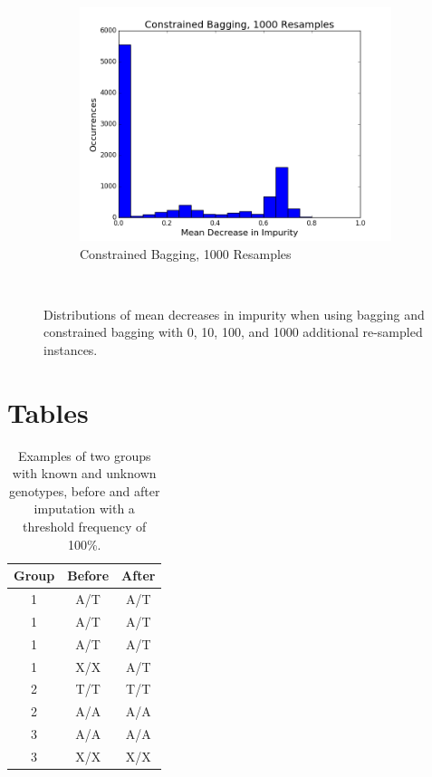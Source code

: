 \begin{figure}[h!]
\begin{subfigure}[b]{0.45\textwidth}
    \includegraphics[width=\textwidth]{figures/random_forests/bagging_bias_constrained_bagging_hist_1000.png}
    \caption{Constrained Bagging, 1000 Resamples}
    \label{fig:bagging-bias-constrained-1000}
  \end{subfigure}
  ~
  \caption{Distributions of mean decreases in impurity when using bagging and constrained bagging with 0, 10, 100, and 1000 additional re-sampled instances.}
  \label{fig:bagging-bias}
\end{figure}

\section{Tables}
\begin{table}[h!]
  \begin{center}
    \begin{tabular}{ c c c}
      \hline
      \textbf{Group} & \textbf{Before} & \textbf{After}\\ \hline
      1 & A/T & A/T \\
      1 & A/T & A/T \\
      1 & A/T & A/T \\
      1 & X/X & A/T \\
      2 & T/T & T/T \\
      2 & A/A & A/A \\
      3 & A/A & A/A \\
      3 & X/X & X/X \\
    \end{tabular}
  \end{center}
  \caption{Examples of two groups with known and unknown genotypes, before and after imputation with a threshold frequency of 100\%.}
  \label{tab:unknown-genotypes-example}
\end{table}

